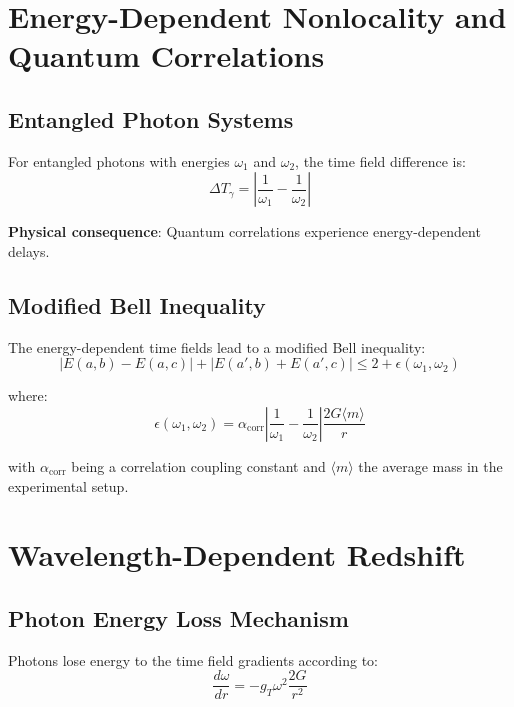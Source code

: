 \documentclass[12pt,a4paper]{article}
\begin{document}
	\section{Energy-Dependent Nonlocality and Quantum Correlations}
	
	\subsection{Entangled Photon Systems}
	
	For entangled photons with energies $\omega_1$ and $\omega_2$, the time field difference is:
	\begin{equation}
		\Delta T_\gamma = \left|\frac{1}{\omega_1} - \frac{1}{\omega_2}\right|
		\label{eq:time_field_difference}
	\end{equation}
	
	\textbf{Physical consequence}: Quantum correlations experience energy-dependent delays.
	
	\subsection{Modified Bell Inequality}
	
	The energy-dependent time fields lead to a modified Bell inequality:
	\begin{equation}
		|E(a,b) - E(a,c)| + |E(a',b) + E(a',c)| \leq 2 + \epsilon(\omega_1, \omega_2)
		\label{eq:modified_bell_inequality}
	\end{equation}
	
	where:
	\begin{equation}
		\epsilon(\omega_1, \omega_2) = \alpha_{\text{corr}} \left|\frac{1}{\omega_1} - \frac{1}{\omega_2}\right| \frac{2G\langle m \rangle}{r}
		\label{eq:bell_correction}
	\end{equation}
	
	with $\alpha_{\text{corr}}$ being a correlation coupling constant and $\langle m \rangle$ the average mass in the experimental setup.
	
	\section{Wavelength-Dependent Redshift}
	
	\subsection{Photon Energy Loss Mechanism}
	
	Photons lose energy to the time field gradients according to:
	\begin{equation}
		\frac{d\omega}{dr} = -g_T \omega^2 \frac{2G}{r^2}
		\label{eq:photon_energy_loss}
	\end{equation}
	
\end{document}
